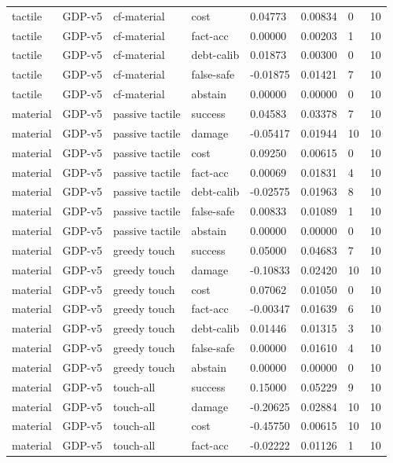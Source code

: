 \documentclass{article}
\begin{document}
\begin{center}
\begin{longtable}{llllllll}
tactile & GDP-v5 & cf-material & cost & 0.04773 & 0.00834 & 0 & 10 \\
tactile & GDP-v5 & cf-material & fact-acc & 0.00000 & 0.00203 & 1 & 10 \\
tactile & GDP-v5 & cf-material & debt-calib & 0.01873 & 0.00300 & 0 & 10 \\
tactile & GDP-v5 & cf-material & false-safe & -0.01875 & 0.01421 & 7 & 10 \\
tactile & GDP-v5 & cf-material & abstain & 0.00000 & 0.00000 & 0 & 10 \\
material & GDP-v5 & passive tactile & success & 0.04583 & 0.03378 & 7 & 10 \\
material & GDP-v5 & passive tactile & damage & -0.05417 & 0.01944 & 10 & 10 \\
material & GDP-v5 & passive tactile & cost & 0.09250 & 0.00615 & 0 & 10 \\
material & GDP-v5 & passive tactile & fact-acc & 0.00069 & 0.01831 & 4 & 10 \\
material & GDP-v5 & passive tactile & debt-calib & -0.02575 & 0.01963 & 8 & 10 \\
material & GDP-v5 & passive tactile & false-safe & 0.00833 & 0.01089 & 1 & 10 \\
material & GDP-v5 & passive tactile & abstain & 0.00000 & 0.00000 & 0 & 10 \\
material & GDP-v5 & greedy touch & success & 0.05000 & 0.04683 & 7 & 10 \\
material & GDP-v5 & greedy touch & damage & -0.10833 & 0.02420 & 10 & 10 \\
material & GDP-v5 & greedy touch & cost & 0.07062 & 0.01050 & 0 & 10 \\
material & GDP-v5 & greedy touch & fact-acc & -0.00347 & 0.01639 & 6 & 10 \\
material & GDP-v5 & greedy touch & debt-calib & 0.01446 & 0.01315 & 3 & 10 \\
material & GDP-v5 & greedy touch & false-safe & 0.00000 & 0.01610 & 4 & 10 \\
material & GDP-v5 & greedy touch & abstain & 0.00000 & 0.00000 & 0 & 10 \\
material & GDP-v5 & touch-all & success & 0.15000 & 0.05229 & 9 & 10 \\
material & GDP-v5 & touch-all & damage & -0.20625 & 0.02884 & 10 & 10 \\
material & GDP-v5 & touch-all & cost & -0.45750 & 0.00615 & 10 & 10 \\
material & GDP-v5 & touch-all & fact-acc & -0.02222 & 0.01126 & 1 & 10 \\

\end{longtable}
\end{center}
\end{document}
